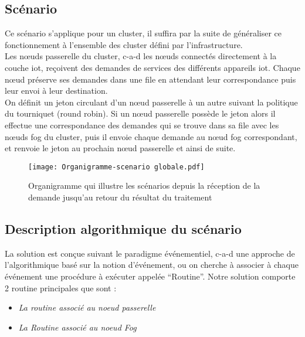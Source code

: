 \subsection{Scénario}
Ce scénario s’applique pour un cluster, il suffira par la suite de généraliser ce fonctionnement à l'ensemble des cluster défini par l’infrastructure.\\
Les nœuds passerelle du cluster, c-a-d les nœuds connectés directement à la couche iot, reçoivent des demandes de services des différents appareils iot. Chaque nœud préserve ses demandes dans une file en attendant leur correspondance puis leur envoi à leur destination.\\
On définit un jeton circulant d’un nœud passerelle à un autre suivant la politique du tourniquet (round robin). Si un nœud passerelle possède le jeton alors il effectue une correspondance des demandes qui se trouve dans sa file avec les nœuds fog du cluster, puis il envoie chaque demande au nœud fog correspondant, et  renvoie le jeton au prochain nœud passerelle et ainsi de suite.
\begin{figure}[H]
    \centering
    \texttt{[image: Organigramme-scenario globale.pdf]}
    \caption{Organigramme qui illustre les scénarios depuis la réception de la demande jusqu’au retour du résultat du traitement}
    \label{fig:Topologie_generale de_linfrastructure}
\end{figure}
\subsection{Description algorithmique du scénario}
La solution est conçue suivant le paradigme événementiel, c-a-d une approche de l’algorithmique basé sur la notion d'événement, ou on cherche à associer à chaque événement une procédure à exécuter appelée “Routine”.   
Notre solution comporte 2 routine principales que sont :
\begin{itemize}
    \item \emph{La routine associé au noeud passerelle}
    \item \emph{La Routine associé au noeud Fog}
\end{itemize}
